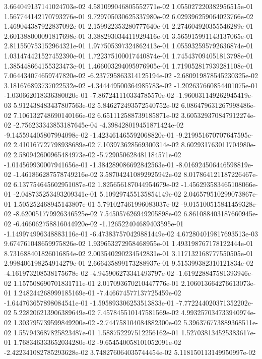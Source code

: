 3.664049137141024703e-02
4.581099046805552771e-02
1.055027220382956515e-01
1.567744142170793276e-01
9.729705030625337980e-02
6.029396259064023766e-02
1.469044387922837092e-01
2.159922353280777640e-01
2.274604920355546289e-01
2.601388000091817698e-01
3.388293034411929416e-01
3.565915991143137065e-01
2.811550753152964321e-01
1.977505397324862413e-01
1.055932595792636874e-01
1.031474421527452390e-01
1.722375100017440874e-01
1.745437094051813798e-01
1.385448664155323473e-01
1.466003294095976905e-01
1.719052817939281108e-01
7.064434074659747820e-02
-6.237795863314125194e-02
-2.680919878545230325e-02
3.181676893737022532e-02
-4.344449500364985783e-02
-1.202637660854401075e-01
-1.030662018336380020e-01
-7.867241110334785570e-02
-1.960031149262945419e-03
5.912438483437807563e-02
5.846272493572540752e-02
6.086479631267998486e-02
7.106132748690140166e-02
6.651112588739185871e-02
3.605329370847912274e-02
-2.756233343853187645e-04
-4.398428019451871424e-02
-9.145594405807994098e-02
-1.423461465592068820e-01
-9.219951670707647595e-02
2.410167727798938689e-02
7.103973628569300314e-02
8.602931763011704980e-02
2.580942600965484973e-02
-5.729050628481184571e-02
-1.014569930007941656e-01
-1.384289086692842563e-01
-8.016924506446598819e-02
-1.461866287578749216e-02
3.587042410892925942e-02
8.017864121187226467e-02
6.137754645602951087e-02
1.825656187044954679e-02
-1.456293583465108066e-01
-2.048735253493209341e-01
5.109297455135854149e-02
2.046579510299073867e-01
1.505252468945143807e-01
5.791027461996083037e-02
-9.015100515841459328e-02
-8.620051779926346525e-02
7.545057626949205898e-02
6.861088403187660945e-02
-6.466062758816044920e-02
-1.126522404689403595e-01
-1.149974996348883116e-01
-6.473837570429881449e-02
4.672804019817693513e-03
9.674761048659975826e-02
1.939653272958468955e-01
1.493198767178122444e-01
8.731688401826016854e-02
2.003540290234542831e-01
3.117132168777550505e-01
2.998406198254914279e-01
2.666435899173288937e-01
9.515399382310121834e-02
-4.161973208538175678e-02
-4.945906273341493797e-02
-1.619228847581393946e-02
1.157508690701831711e-01
2.017093670210447776e-01
2.106013664276613073e-01
1.248244268999185169e-01
-7.446674577137725459e-02
-1.644763657898084541e-01
-1.595893306253513833e-01
-7.772244020371352202e-02
5.228206213906389649e-02
7.457845510147581569e-02
4.993257034733940974e-02
1.303795739599849200e-02
-2.744758104084882300e-02
5.396376773889368511e-02
1.557943687825823487e-01
1.588752297512256162e-01
1.527038134525383617e-01
1.768346333652034280e-02
-9.654540058101052091e-02
-2.422341082785293628e-02
3.748276064035744454e-02
5.118150113149950997e-02

